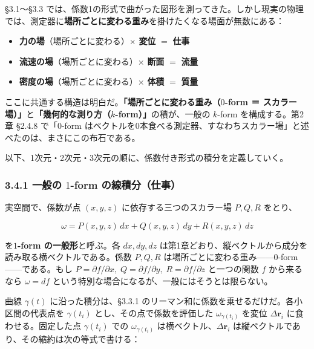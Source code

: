 \documentclass[a4paper,12pt,openany]{book}
\begin{document}
§3.1〜§3.3
では、係数1の形式で曲がった図形を測ってきた。しかし現実の物理では、測定器に\textbf{場所ごとに変わる重み}を掛けたくなる場面が無数にある：

\begin{itemize}
\item
  \textbf{力の場}（場所ごとに変わる）\(\times\) \textbf{変位} \(=\)
  \textbf{仕事}
\item
  \textbf{流速の場}（場所ごとに変わる）\(\times\) \textbf{断面} \(=\)
  \textbf{流量}
\item
  \textbf{密度の場}（場所ごとに変わる）\(\times\) \textbf{体積} \(=\)
  \textbf{質量}
\end{itemize}

ここに共通する構造は明白だ。\textbf{「場所ごとに変わる重み（$0$-form ＝ スカラー場）」}と\textbf{「幾何的な測り方（$k$-form）」}の積が、一般の
\(k\)-form を構成する。第2章 §2.4.8 で「\(0\)-form
はベクトルを0本食べる測定器、すなわちスカラー場」と述べたのは、まさにこの布石である。

以下、1次元・2次元・3次元の順に、係数付き形式の積分を定義していく。

\hypertarget{ux4e00ux822cux306e-1-form-ux306eux7ddaux7a4dux5206ux4ed5ux4e8b}{%
\subsubsection{\texorpdfstring{3.4.1 一般の \(1\)-form
の線積分（仕事）}{3.4.1 一般の 1-form の線積分（仕事）}}\label{ux4e00ux822cux306e-1-form-ux306eux7ddaux7a4dux5206ux4ed5ux4e8b}}

実空間で、係数が点 \((x,y,z)\) に依存する三つのスカラー場 \(P,Q,R\)
をとり、

\[\omega = P(x,y,z)\,dx + Q(x,y,z)\,dy + R(x,y,z)\,dz\]

を\textbf{$1$-form の一般形}と呼ぶ。各 \(dx, dy, dz\)
は第1章どおり、縦ベクトルから成分を読み取る横ベクトルである。係数
\(P,Q,R\) は場所ごとに変わる重み——\(0\)-form——である。もし
\(P=\partial f/\partial x,\;Q=\partial f/\partial y,\;R=\partial f/\partial z\)
と一つの関数 \(f\) から来るなら \(\omega=df\)
という特別な場合になるが、一般にはそうとは限らない。

曲線 \(\gamma(t)\) に沿った積分は、§3.3.1
のリーマン和に係数を乗せるだけだ。各小区間の代表点を \(\gamma(t_i)\)
とし、その点で係数を評価した \(\omega_{\gamma(t_i)}\) を変位
\(\Delta\mathbf{r}_i\) に食わせる。固定した点 \(\gamma(t_i)\) での
\(\omega_{\gamma(t_i)}\) は横ベクトル、\(\Delta\mathbf{r}_i\)
は縦ベクトルであり、その縮約は次の等式で書ける：
\end{document}
